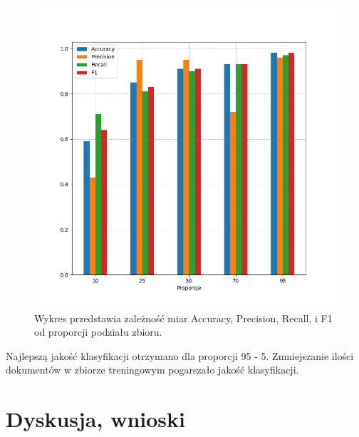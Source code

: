 \documentclass{classrep}
\begin{document}
\begin{figure}[h!]
 \centering
 \includegraphics[width=15cm]{wykres_proporcje.png}
 \vspace{-0.3cm}
 \caption{Wykres przedstawia zależność miar Accuracy, Precision, Recall, i F1 od proporcji podziału zbioru.}
 \label{wykres4}
\end{figure}

\newpage


Najlepszą jakość klasyfikacji otrzymano dla proporcji 95 - 5. Zmniejszanie ilości dokumentów w zbiorze treningowym pogarszało jakość klasyfikacji.\\

\newpage

\section{Dyskusja, wnioski}
\end{document}
